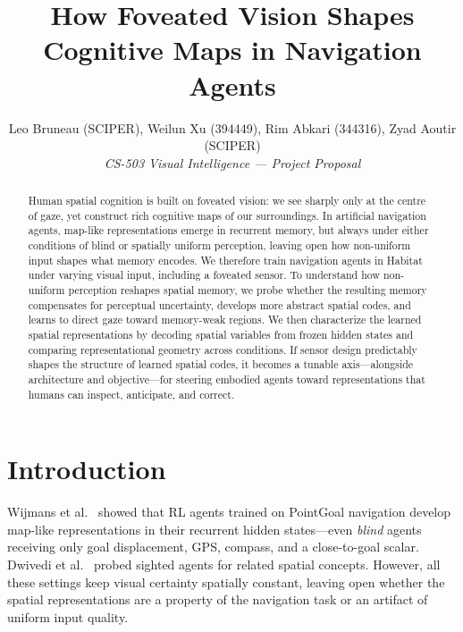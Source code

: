 \documentclass[10pt,conference,compsocconf]{IEEEtran}
\begin{document}
\title{\vspace{-8pt}How Foveated Vision Shapes Cognitive Maps in Navigation Agents\vspace{-12pt}}

\author{
  Leo Bruneau (SCIPER), Weilun Xu (394449), Rim Abkari (344316), Zyad Aoutir (SCIPER)\\
  \textit{CS-503 Visual Intelligence --- Project Proposal}
}

\maketitle

\begin{abstract}
Human spatial cognition is built on foveated vision: we see sharply only at the centre of gaze, yet construct rich cognitive maps of our surroundings. In artificial navigation agents, map-like representations emerge in recurrent memory, but always under either conditions of blind or spatially uniform perception, leaving open how non-uniform input shapes what memory encodes. We therefore train navigation agents in Habitat under varying visual input, including a foveated sensor. To understand how non-uniform perception reshapes spatial memory, we probe whether the resulting memory compensates for perceptual uncertainty, develops more abstract spatial codes, and learns to direct gaze toward memory-weak regions. We then characterize the learned spatial representations by decoding spatial variables from frozen hidden states and comparing representational geometry across conditions. If sensor design predictably shapes the structure of learned spatial codes, it becomes a tunable axis---alongside architecture and objective---for steering embodied agents toward representations that humans can inspect, anticipate, and correct.
\end{abstract}


\section{Introduction}

Wijmans et al.~\cite{wijmans2023emergence} showed that RL agents trained on PointGoal navigation develop map-like representations in their recurrent hidden states---even \emph{blind} agents receiving only goal displacement, GPS, compass, and a close-to-goal scalar. Dwivedi et al.~\cite{dwivedi2022isee} probed sighted agents for related spatial concepts. However, all these settings keep visual certainty spatially constant, leaving open whether the spatial representations are a property of the navigation task or an artifact of uniform input quality.
\end{document}
